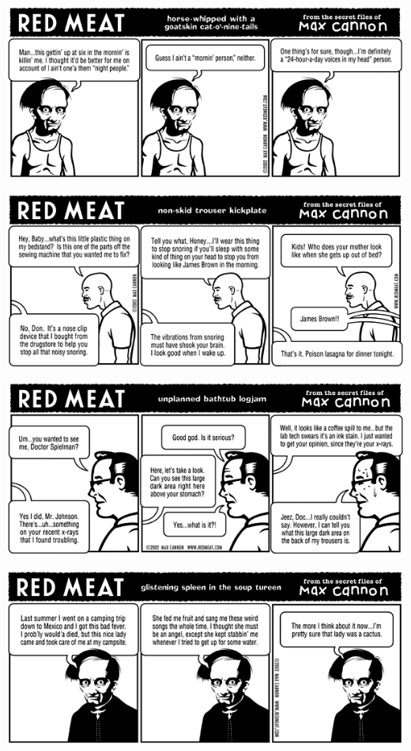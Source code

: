\documentclass[a4paper,twoside,11pt]{article}
\begin{document}
\includegraphics[width=\textwidth]{redmeat_2002-02-19.png}



\includegraphics[width=\textwidth]{redmeat_2002-02-26.png}



\includegraphics[width=\textwidth]{redmeat_2002-03-05.png}



\includegraphics[width=\textwidth]{redmeat_2002-03-12.png}
\end{document}
